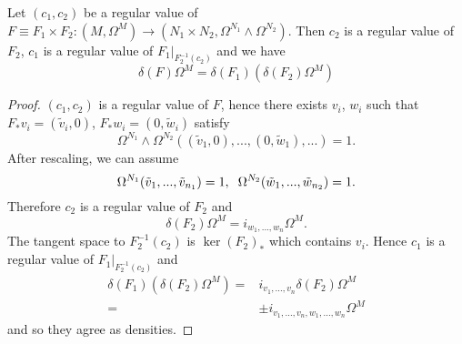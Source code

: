 \begin{proposition}\label{delta_associative}
Let $(c_1,c_2)$ be a regular value of $F\equiv F_1\times F_2:(M,\Omega^M)\rightarrow (N_1\times N_2,\Omega^{N_1}\wedge\Omega^{N_2})$.  Then $c_2$ is a regular value of $F_2$, $c_1$ is a regular value of $F_1|_{F_2^{-1}(c_2)}$ and we have
\begin{equation}
\delta(F)\Omega^M=\delta(F_1)(\delta(F_2)\Omega^M)
\end{equation}
\end{proposition}
\begin{proof}
$(c_1,c_2)$ is a regular value of $F$, hence there exists $v_i$, $w_i$ such that $F_* v_i=(\tilde{v}_i,0)$, $F_* w_i=(0,\tilde{w}_i)$ satisfy 
\begin{equation}
\Omega^{N_1}\wedge\Omega^{N_2}( (\tilde{v}_1,0),..., (0,\tilde{w}_1),...)=1.
\end{equation}
After rescaling, we can assume
\begin{equation}
\Omega^{N_1}( \tilde{v}_1,...,\tilde{v}_{n_1})=1,\hspace{2mm} \Omega^{N_2}(\tilde{w}_1,...,\tilde{w}_{n_2})=1.
\end{equation}
Therefore $c_2$ is a regular value of $F_2$ and 
\begin{equation}
\delta(F_2)\Omega^M=i_{w_1,...,w_n}\Omega^M.
\end{equation}
The tangent space to $F_2^{-1}(c_2)$ is $\ker (F_2)_*$ which contains $v_i$.  Hence $c_1$ is a regular value of $F_1|_{F_2^{-1}(c_2)}$ and 
\begin{align}
\delta(F_1)(\delta(F_2)\Omega^M)=&i_{v_1,...,v_n}\delta(F_2)\Omega^M\\
=&\pm i_{v_1,...,v_n,w_1,...,w_n}\Omega^M
\end{align}
and so they agree as densities.
\end{proof}

